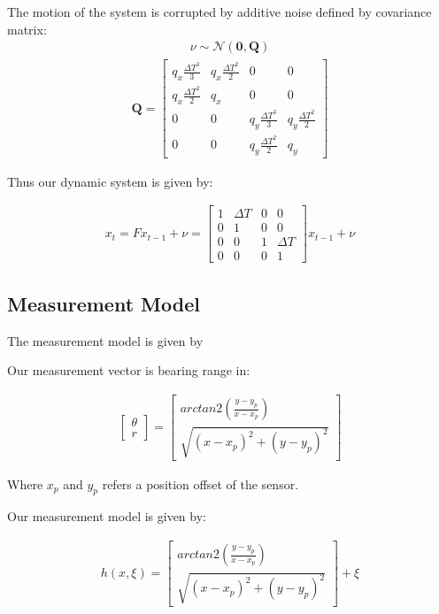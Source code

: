 \documentclass{article}
\begin{document}
The motion of the system is corrupted by additive noise defined by covariance matrix:
\begin{align*}
 \nu \sim \mathcal{N}(\mathbf{0},\mathbf{Q})
\end{align*}
\begin{align*}
 \mathbf{Q} = \begin{bmatrix} q_x \tfrac{\Delta T^3}{3} & q_x \tfrac{\Delta T^2}{2}  & 0 & 0 \\
				    q_x\tfrac{\Delta T^2}{2} & q_x & 0 & 0 \\
				    0 & 0 & q_y \tfrac{\Delta T^3}{3} & q_y \tfrac{\Delta T^2}{2} \\
				    0 & 0 & q_y \tfrac{\Delta T^2}{2} & q_y
	\end{bmatrix}
\end{align*}

Thus our dynamic system is given by:

\begin{align*}
x_{t} = F x_{t-1} + \nu = \begin{bmatrix} 1 & \Delta T & 0 & 0 \\
				    0 & 1 & 0 & 0 \\
				    0 & 0 & 1 & \Delta T \\
				    0 & 0 & 0 & 1
	\end{bmatrix} x_{t-1} + \nu
\end{align*}
\subsection{Measurement Model}

The measurement model is given by

Our measurement vector is bearing range in:

\begin{align*}
\begin{bmatrix}
\theta \\ 
r
\end{bmatrix} = 
\begin{bmatrix}
arctan2(\frac{y-y_p}{x-x_p}) \\
\sqrt{(x-x_p)^2 + (y-y_p)^2}
\end{bmatrix}
\end{align*}

Where $x_p$ and $y_p$ refers a position offset of the sensor.

Our measurement model is given by:

\begin{align*}
h(x,\xi) = \begin{bmatrix}
arctan2(\frac{y-y_p}{x-x_p}) \\
\sqrt{(x-x_p)^2 + (y-y_p)^2}
\end{bmatrix} + \xi
\end{align*}
\end{document}
